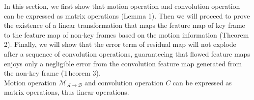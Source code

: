 \documentclass[titlepage]{article}
\begin{document}
\noindent




In this section, we first show that motion operation and convolution operation can be expressed as matrix operations (Lemma 1). 
Then we will proceed to prove the existence of a linear transformation that maps the feature map of key frame to the feature map of non-key frames based on the motion information (Theorem 2).
Finally, we will show that the error term of residual map will not explode after a sequence of convolution operations, guaranteeing that flowed feature maps enjoys only a negligible error from the convolution feature map generated from the non-key frame (Theorem 3). \\



 Motion operation $\mathcal{M}_{\mathcal{A} \to \mathcal{B}}$ and convolution operation $C$ can be expressed as matrix operations, thus linear operations. \\
\end{document}
